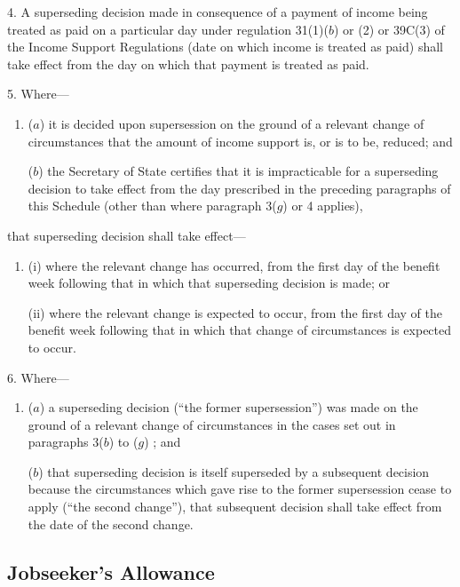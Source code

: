\documentclass[12pt,a4paper]{article}
\begin{document}
\medskip

4.  A superseding decision made in consequence of a payment of income being treated as paid on a particular day under regulation 31(1)($b$)  or (2) or 39C(3) of the Income Support Regulations (date on which income is treated as paid) shall take effect from the day on which that payment is treated as paid.

\medskip

5.  Where—
\begin{enumerate}\item[]
($a$) it is decided upon supersession on the ground of a relevant change of circumstances that the amount of income support is, or is to be, reduced; and

($b$) the Secretary of State certifies that it is impracticable for a superseding decision to take effect from the day prescribed in the preceding paragraphs of this Schedule (other than where paragraph 3($g$)  or 4 applies),
\end{enumerate}
that superseding decision shall take effect—
\begin{enumerate}\item[]
(i) where the relevant change has occurred, from the first day of the benefit week following that in which that superseding decision is made; or

(ii) where the relevant change is expected to occur, from the first day of the benefit week following that in which that change of circumstances is expected to occur.
\end{enumerate}

\medskip

6.  Where—
\begin{enumerate}\item[]
($a$) a superseding decision (“the former supersession”) was made on the ground of a relevant change of circumstances in the cases set out in paragraphs 3($b$)  to ($g$) ; and

($b$) that superseding decision is itself superseded by a subsequent decision because the circumstances which gave rise to the former supersession cease to apply (“the second change”), that subsequent decision shall take effect from the date of the second change.
\end{enumerate}

\subsection*{Jobseeker’s Allowance}
\end{document}
